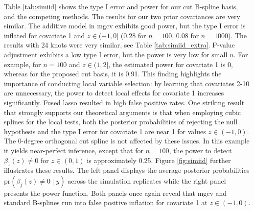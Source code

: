 Table \ref{tab:simiid} shows the type I error and power for our cut B-spline basis, and the competing methods.
 The results for our two prior covariances are very similar. The additive model in mgcv exhibits good power, but the type I error is inflated for covariate 1 and $z \in (-1,0]$ (0.28 for $n=100$, 0.08 for $n=1000$). The results with 24 knots were very similar, see Table \ref{tab:simiid_extra}. 
P-value adjustment exhibits a low type I error, but the power is very low for small $n$. For example, for $n=100$ and $z \in (1,2]$, the estimated power for covariate 1 is 0, whereas for the proposed cut basis, it is 0.91. This finding highlights the importance of conducting local variable selection:  by learning that covariates 2-10 are unnecessary, the power to detect local effects for covariate 1 increases significantly.
 Fused lasso resulted in high false positive rates. 
One striking result that strongly supports our theoretical arguments is that when employing cubic splines for the local tests, both the posterior probabilities of rejecting the null hypothesis and the type I error for covariate 1 are near 1 for values  $z \in (-1,0)$. The 0-degree orthogonal cut spline is not affected by these issues. In this example it yields near-perfect inference, except that for $n=100$, the power to detect $\beta_1(z) \neq 0$ for $z \in (0,1)$ is approximately 0.25.
 Figure \ref{fig:simiid}  further illustrates these results. The left panel displays the average posterior probabilities $\mbox{pr}(\beta_j(z) \neq 0 \mid y)$ across the simulation replicates while the right panel presents the power function. Both panels once again reveal that  mgcv and  standard B-splines run into false positive inflation for covariate 1 at $z \in (-1,0)$.



